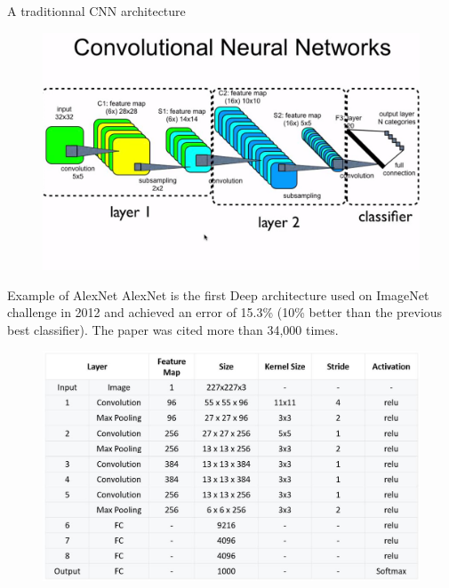\documentclass[handout]{beamer}
\begin{document}
\begin{frame}{A traditionnal CNN architecture}
    \begin{figure}
\centering
    \includegraphics[width=.8\textwidth,trim={0 0cm 0cm 3cm},clip]{fig/L2/CNN.png}
\end{figure}
\end{frame}

\begin{frame}{Example of AlexNet}
    \alert{AlexNet} is the first Deep architecture used on ImageNet challenge in 2012 and achieved an \alert{error of 15.3\%} (10\% better than the previous best classifier). The paper was cited more than 34,000 times.
     

     \nocite{Krizhevsky2012ImageNetNetworks}

    
    \begin{figure}
        \centering
        \includegraphics[width=.5\textwidth]{fig/L2/AlexNet_Summary_Table.jpg}

    \end{figure}
\end{frame}
\end{document}
